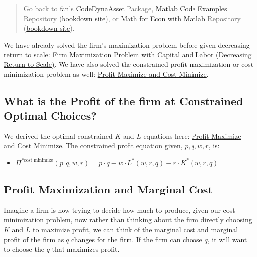 \documentclass[
]{book}
\providecommand{\tightlist}{%
  \setlength{\itemsep}{0pt}\setlength{\parskip}{0pt}}
\begin{document}
\begin{quote}
Go back to \href{http://fanwangecon.github.io/}{fan}'s \href{https://fanwangecon.github.io/CodeDynaAsset/}{CodeDynaAsset} Package, \href{https://fanwangecon.github.io/M4Econ/}{Matlab Code Examples} Repository (\href{https://fanwangecon.github.io/M4Econ/bookdown}{bookdown site}), or \href{https://fanwangecon.github.io/Math4Econ/}{Math for Econ with Matlab} Repository (\href{https://fanwangecon.github.io/Math4Econ/bookdown}{bookdown site}).
\end{quote}

We have already solved the firm's maximization problem before given
decreasing return to scale: \href{https://fanwangecon.github.io/Math4Econ/matrix_application/KL_borrowhire_firm.html}{Firm Maximization Problem with Capital and
Labor (Decreasing Return to
Scale)}.
We have also solved the constrained profit maximization or cost
minimization problem as well: \href{https://fanwangecon.github.io/Math4Econ/opti_firm_constrained/profit_maximize.html}{Profit Maximize and Cost
Minimize}.

\hypertarget{what-is-the-profit-of-the-firm-at-constrained-optimal-choices}{%
\subsection{What is the Profit of the firm at Constrained Optimal Choices?}\label{what-is-the-profit-of-the-firm-at-constrained-optimal-choices}}

We derived the optimal constrained \(K\) and \(L\) equations here: \href{https://fanwangecon.github.io/Math4Econ/opti_firm_constrained/profit_maximize.html}{Profit
Maximize and Cost
Minimize}.
The constrained profit equation given, \(p,q,w,r\), is:

\begin{itemize}
\tightlist
\item
  \(\displaystyle \Pi^{*\textrm{cost}\;\textrm{minimize}} (p,q,w,r)=p\cdot q-w\cdot L^* (w,r,q)-r\cdot K^* (w,r,q)\)
\end{itemize}

\hypertarget{profit-maximization-and-marginal-cost}{%
\subsection{Profit Maximization and Marginal Cost}\label{profit-maximization-and-marginal-cost}}

Imagine a firm is now trying to decide how much to produce, given our
cost minimization problem, now rather than thinking about the firm
directly choosing \(K\) and \(L\) to maximize profit, we can think of the
marginal cost and marginal profit of the firm as \(q\) changes for the
firm. If the firm can choose \(q\), it will want to choose the \(q\) that
maximizes profit.
\end{document}
